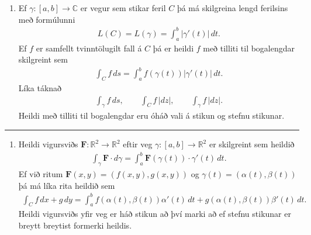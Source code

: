 \documentclass[a4paper,10pt,icelandic]{sphinxmanual}
\begin{document}
\begin{enumerate}
%
\setcounter{enumi}{1}
\item {} 
Ef \(\gamma:[a,b]\rightarrow {\mathbb{C}}\) er vegur sem stikar feril \(C\) þá má skilgreina lengd ferilsins með formúlunni
\begin{equation*}
\begin{split}L(C)=L(\gamma)=\int_a^b|\gamma'(t)|\,dt.\end{split}
\end{equation*}
Ef \(f\) er samfellt tvinntölugilt fall á \(C\) þá er heildi \(f\) með tilliti til bogalengdar skilgreint sem
\begin{equation*}
\begin{split}\int_C f\,ds=\int_a^b f(\gamma(t))|\gamma'(t)|\,dt.\end{split}
\end{equation*}
Líka táknað
\begin{equation*}
\begin{split}\int_\gamma f\,ds, \qquad \int_C f\,|dz|,\qquad \int_\gamma f\,|dz|.\end{split}
\end{equation*}
Heildi með tilliti til bogalengdar eru óháð vali á stikun og stefnu stikunar.

\end{enumerate}


\bigskip\hrule\bigskip

\begin{enumerate}
%
\setcounter{enumi}{2}
\item {} 
Heildi vigursviðs \(\mathbf{F}:{\mathbb R}^2\rightarrow {\mathbb R}^2\) eftir veg \(\gamma:[a,b]\rightarrow {\mathbb R}^2\) er skilgreint sem heildið
\begin{equation*}
\begin{split}\int_\gamma \mathbf{F}\cdot d\gamma=\int_a^b\mathbf{F}(\gamma(t))\cdot \gamma'(t)\,dt.\end{split}
\end{equation*}
Ef við ritum \(\mathbf{F}(x,y)=(f(x,y),g(x,y))\) og \(\gamma(t)=(\alpha(t), \beta(t))\) þá má líka rita heildið sem
\begin{equation*}
\begin{split}\int_C f\,dx+g\,dy=\int_a^b f(\alpha(t), \beta(t))\alpha'(t)\,dt+g(\alpha(t), \beta(t))\beta'(t)\,dt.\end{split}
\end{equation*}
Heildi vigursviðs yfir veg er háð stikun að því marki að ef stefnu stikunar er breytt breytist formerki heildis.

\end{enumerate}
\end{document}
